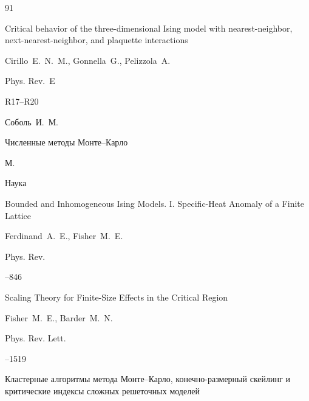 \begin{thebibliography}{91}

\paper  Critical behavior of the three-dimensional Ising model with nearest-neighbor, next-nearest-neighbor, and plaquette interactions

\by  Cirillo~E.~N.~M., Gonnella~G., Pelizzola~A. 

\jour Phys. Rev.~E




\pages R17--R20





\by Соболь~И.~М.

\book Численные методы Монте--Карло

\publaddr М.

\publ Наука







\paper  Bounded and Inhomogeneous Ising Models. I. Specific-Heat Anomaly of a Finite Lattice

\by Ferdinand~A.~E., Fisher~M.~E.

\jour Phys. Rev.




--846





\paper   Scaling Theory for Finite-Size Effects in the Critical Region

\by  Fisher~M.~E.,  Barder~M.~N.

\jour Phys. Rev. Lett.




--1519





\paper Кластерные алгоритмы метода Монте--Карло, конечно-размерный скейлинг и критические индексы сложных решеточных моделей


\end{thebibliography}
